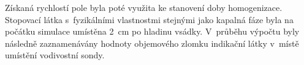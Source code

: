 Získaná rychlostí pole byla poté využita ke stanovení doby homogenizace. Stopovací látka s~fyzikálními vlastnostmi stejnými jako kapalná fáze byla na počátku simulace umístěna \SI{2}{\centi\meter} po hladinu vsádky. V~průběhu výpočtu byly následně zaznamenávány hodnoty objemového zlomku indikační látky v~místě umístění vodivostní sondy.


